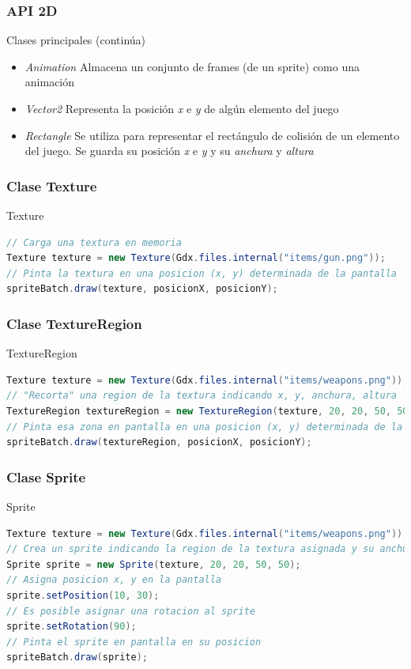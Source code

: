 \documentclass[xcolor={dvipsnames}]{beamer}
\begin{document}
\begin{frame}\frametitle{API 2D}
	\begin{block}{Clases principales (continúa)}
    \begin{itemize}
        \item \emph{\textcolor{resalta}{Animation}} Almacena un conjunto de frames (de un sprite) como una animación
        \item \emph{\textcolor{resalta}{Vector2}} Representa la posición \emph{x} e \emph{y} de algún elemento del juego
        \item \emph{\textcolor{resalta}{Rectangle}} Se utiliza para representar el rectángulo de colisión de un elemento del juego. Se
        guarda su posición \emph{x} e \emph{y} y su \emph{anchura} y \emph{altura}
    \end{itemize}
    \end{block}
\end{frame}

\begin{frame}[fragile]\frametitle{Clase Texture}
	\begin{exampleblock}{Texture}
	\begin{lstlisting}[language=java]
// Carga una textura en memoria
Texture texture = new Texture(Gdx.files.internal("items/gun.png"));
// Pinta la textura en una posicion (x, y) determinada de la pantalla
spriteBatch.draw(texture, posicionX, posicionY);
    \end{lstlisting}    
	\end{exampleblock}
\end{frame}

\begin{frame}[fragile]\frametitle{Clase TextureRegion}
	\begin{exampleblock}{TextureRegion}
	\begin{lstlisting}[language=java]
Texture texture = new Texture(Gdx.files.internal("items/weapons.png"));
// "Recorta" una region de la textura indicando x, y, anchura, altura
TextureRegion textureRegion = new TextureRegion(texture, 20, 20, 50, 50);
// Pinta esa zona en pantalla en una posicion (x, y) determinada de la pantalla
spriteBatch.draw(textureRegion, posicionX, posicionY);
    \end{lstlisting}    
	\end{exampleblock}
\end{frame}

\begin{frame}[fragile]\frametitle{Clase Sprite}
	\begin{exampleblock}{Sprite}
    \begin{lstlisting}[language=java]
Texture texture = new Texture(Gdx.files.internal("items/weapons.png"));
// Crea un sprite indicando la region de la textura asignada y su anchura y altura
Sprite sprite = new Sprite(texture, 20, 20, 50, 50);
// Asigna posicion x, y en la pantalla
sprite.setPosition(10, 30);
// Es posible asignar una rotacion al sprite
sprite.setRotation(90);
// Pinta el sprite en pantalla en su posicion
spriteBatch.draw(sprite);
    \end{lstlisting}
	\end{exampleblock}
\end{frame}
\end{document}
